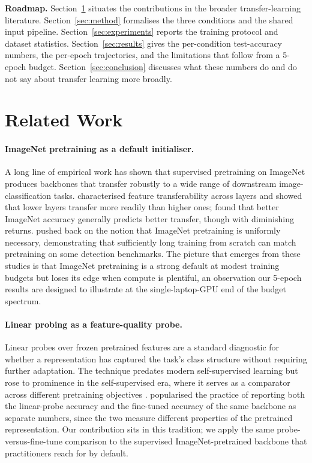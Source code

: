 \documentclass[11pt,twocolumn]{article}
\begin{document}
\textbf{Roadmap.} Section~\ref{sec:related} situates the
contributions in the broader transfer-learning literature.
Section~\ref{sec:method} formalises the three conditions and the
shared input pipeline. Section~\ref{sec:experiments} reports the
training protocol and dataset statistics. Section~\ref{sec:results}
gives the per-condition test-accuracy numbers, the per-epoch
trajectories, and the limitations that follow from a 5-epoch budget.
Section~\ref{sec:conclusion} discusses what these numbers do and do
not say about transfer learning more broadly.


\section{Related Work}
\label{sec:related}

\paragraph{ImageNet pretraining as a default initialiser.}
A long line of empirical work has shown that supervised pretraining
on ImageNet \cite{deng2009imagenet} produces backbones that transfer
robustly to a wide range of downstream image-classification tasks.
\citet{yosinski2014transferable} characterised feature transferability
across layers and showed that lower layers transfer more readily than
higher ones; \citet{kornblith2019better} found that better ImageNet
accuracy generally predicts better transfer, though with diminishing
returns. \citet{he2019rethinking} pushed back on the notion that
ImageNet pretraining is uniformly necessary, demonstrating that
sufficiently long training from scratch can match pretraining on some
detection benchmarks. The picture that emerges from these studies is
that ImageNet pretraining is a strong default at modest training
budgets but loses its edge when compute is plentiful, an observation
our 5-epoch results are designed to illustrate at the
single-laptop-GPU end of the budget spectrum.

\paragraph{Linear probing as a feature-quality probe.}
Linear probes over frozen pretrained features are a standard
diagnostic for whether a representation has captured the task's class
structure without requiring further adaptation. The technique
predates modern self-supervised learning but rose to prominence in
the self-supervised era, where it serves as a comparator across
different pretraining objectives \cite{chen2020simple,he2020momentum,
caron2020swav}. \citet{chen2020simple} popularised the practice of
reporting both the linear-probe accuracy and the fine-tuned accuracy
of the same backbone as separate numbers, since the two measure
different properties of the pretrained representation. Our
contribution sits in this tradition; we apply the same
probe-versus-fine-tune comparison to the supervised
ImageNet-pretrained backbone that practitioners reach for by default.
\end{document}
